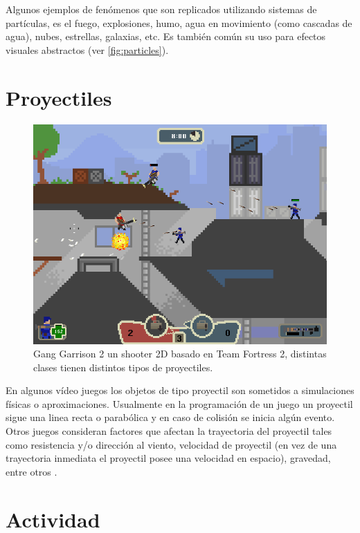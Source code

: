 Algunos ejemplos de fenómenos que son replicados utilizando sistemas de partículas, es el fuego, explosiones, humo, agua en movimiento (como cascadas de agua), nubes, estrellas, galaxias, etc. Es también común su uso para efectos visuales abstractos (ver \ref{fig:particles}).
\section{Proyectiles}
\setlength\intextsep{0pt}
\begin{figure}
\includegraphics[width=\linewidth]{semana14/Gang_Garrison_2.png}
\caption{Gang Garrison 2 un shooter 2D basado en Team Fortress 2, distintas clases tienen distintos tipos de proyectiles.}
\label{fig:ganggarrison2}
\end{figure}

En algunos vídeo juegos los objetos de tipo proyectil son sometidos a simulaciones físicas o aproximaciones. Usualmente en la programación de un juego un proyectil sigue una linea recta o parabólica y en caso de colisión se inicia algún evento. Otros juegos consideran factores que afectan la trayectoria del proyectil tales como resistencia y/o dirección al viento, velocidad de proyectil (en vez de una trayectoria inmediata el proyectil posee una velocidad en espacio), gravedad, entre otros \cite{fifa_physics}.~\\

\section{Actividad}
